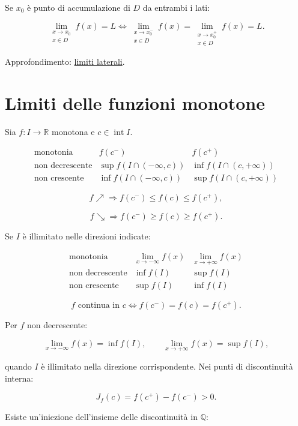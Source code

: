 Se \(x_0\) è punto di accumulazione di \(D\) da entrambi i lati:

\[
\lim_{\substack{x\to x_0\\x\in D}}f(x)=L
\Longleftrightarrow
\lim_{\substack{x\to x_0^-\\x\in D}}f(x)
=
\lim_{\substack{x\to x_0^+\\x\in D}}f(x)
=L.
\]

Approfondimento: \href{https://ingegnerismo.it/matematica/limiti-laterali/}{limiti laterali}.

\section{Limiti delle funzioni monotone}\label{limiti-delle-funzioni-monotone}

Sia \(f:I\to\mathbb R\) monotona e \(c\in\operatorname{int}I\).

\[
\begin{array}{c|c|c}
\text{monotonia}&f(c^-)&f(c^+)\\
\hline
\text{non decrescente}&\sup f(I\cap(-\infty,c))&\inf f(I\cap(c,+\infty))\\
\text{non crescente}&\inf f(I\cap(-\infty,c))&\sup f(I\cap(c,+\infty))
\end{array}
\]

\[
f\nearrow
\Longrightarrow
f(c^-)\le f(c)\le f(c^+),
\]

\[
f\searrow
\Longrightarrow
f(c^-)\ge f(c)\ge f(c^+).
\]

Se \(I\) è illimitato nelle direzioni indicate:

\[
\begin{array}{c|c|c}
\text{monotonia}&\lim_{x\to-\infty}f(x)&\lim_{x\to+\infty}f(x)\\
\hline
\text{non decrescente}&\inf f(I)&\sup f(I)\\
\text{non crescente}&\sup f(I)&\inf f(I)
\end{array}
\]

\[
f\text{ continua in }c
\Longleftrightarrow
f(c^-)=f(c)=f(c^+).
\]

Per \(f\) non decrescente:

\[
\lim_{x\to-\infty}f(x)=\inf f(I),
\qquad
\lim_{x\to+\infty}f(x)=\sup f(I),
\]

quando \(I\) è illimitato nella direzione corrispondente. Nei punti di discontinuità interna:

\[
J_f(c)=f(c^+)-f(c^-)>0.
\]

Esiste un'iniezione dell'insieme delle discontinuità in \(\mathbb Q\):

